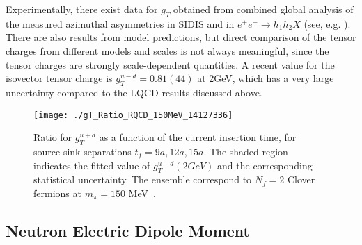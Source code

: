 \documentclass[epj]{webofc}
\newcommand{\cl}{\centerline}
\begin{document}
Experimentally, there exist data for $g_T$ obtained from combined global analysis of the measured azimuthal asymmetries in
SIDIS and in $e^+ e^- \to h_1 h_2 X$ (see, e.g. \cite{Anselmino:2013vqa,Radici:2015mwa}).
There are also results from model predictions, but direct comparison of the tensor charges from different models and scales is
not always meaningful, since the tensor charges are strongly scale-dependent quantities. A recent value for the isovector tensor
charge is $g^{u-d}_T{=}0.81(44)$ at 2GeV, which has a very large uncertainty compared to the LQCD results discussed above.




\begin{figure}[!h]
\cl{\texttt{[image: ./gT\_Ratio\_RQCD\_150MeV\_14127336]}}
\caption{Ratio for $g^{u+d}_T$ as a function of the current insertion time, for source-sink separations $t_f{=}9a, 12a, 15a$. 
The shaded region indicates the fitted value of $g^{u-d}_T(2 GeV)$ and the corresponding statistical uncertainty.
The ensemble correspond to $N_f{=}2$ Clover fermions at $m_\pi{=}150$ MeV~\cite{Bali:2014nma}.}
\label{fig_gT_ratio}
\end{figure}
\FloatBarrier

\vspace*{-0.5cm}
\subsection{Neutron Electric Dipole Moment}
\label{sub3_2}
\end{document}

